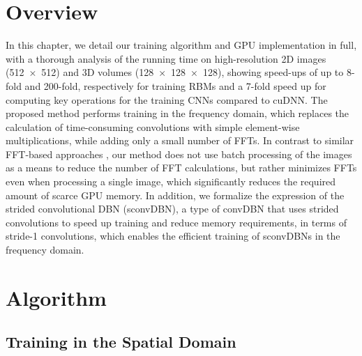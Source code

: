 \section{Overview}

In this chapter, we detail our training algorithm and GPU implementation in
full, with a thorough analysis of the running time on high-resolution 2D images
(\num{512x512}) and 3D volumes (\num{128x128x128}), showing speed-ups of up to
8-fold and 200-fold, respectively for training RBMs and a 7-fold speed up for
computing key operations for the training CNNs compared to cuDNN. The proposed
method performs training in the frequency domain, which replaces the calculation
of time-consuming convolutions with simple element-wise multiplications, while
adding only a small number of FFTs. In contrast to similar FFT-based approaches
\citep[e.g.,][]{mathieu2013}, our method does not use batch processing of the
images as a means to reduce the number of FFT calculations, but rather minimizes
FFTs even when processing a single image, which significantly reduces the
required amount of scarce GPU memory.
In addition, we formalize the expression of the strided convolutional DBN
(sconvDBN), a type of convDBN that uses strided convolutions to speed up
training and reduce memory requirements, in terms of stride-1 convolutions,
which enables the efficient training of sconvDBNs in the frequency domain.


\section{Algorithm}


\subsection{Training in the Spatial Domain}

